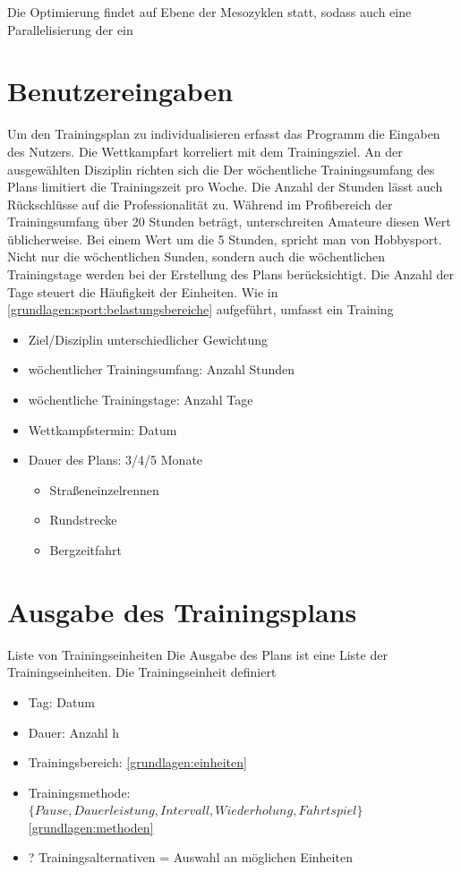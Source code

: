 Die Optimierung findet auf Ebene der Mesozyklen statt, sodass auch eine Parallelisierung der ein
\section{Benutzereingaben}
Um den Trainingsplan zu individualisieren erfasst das Programm die Eingaben des Nutzers. \newline
Die Wettkampfart korreliert mit dem Trainingsziel. An der ausgewählten Disziplin richten sich die \newline
Der wöchentliche Trainingsumfang des Plans limitiert die Trainingszeit pro Woche. Die Anzahl der Stunden lässt auch Rückschlüsse auf die Professionalität zu. Während im Profibereich der Trainingsumfang über 20 Stunden beträgt, unterschreiten Amateure diesen Wert üblicherweise. Bei einem Wert um die 5 Stunden, spricht man von Hobbysport. \newline
Nicht nur die wöchentlichen Sunden, sondern auch die wöchentlichen Trainingstage werden bei der Erstellung des Plans berücksichtigt. Die Anzahl der Tage steuert die Häufigkeit der Einheiten.
Wie in \ref{grundlagen:sport:belastungsbereiche} aufgeführt, umfasst ein Training 
\begin{itemize}
    \item Ziel/Disziplin \cite[S.11]{Radsporttraining} unterschiedlicher Gewichtung\cite[S.14]{Radsporttraining}
    \item wöchentlicher Trainingsumfang: Anzahl Stunden
    \item wöchentliche Trainingstage: Anzahl Tage
    \item Wettkampfstermin: Datum
    \item Dauer des Plans: 3/4/5 Monate
    \begin{itemize}
        \item Straßeneinzelrennen
        \item Rundstrecke
        \item Bergzeitfahrt
    \end{itemize}
\end{itemize}

\section{Ausgabe des Trainingsplans}
Liste von Trainingseinheiten
\label{sec:modellierung:output}
Die Ausgabe des Plans ist eine Liste der Trainingseinheiten. Die Trainingseinheit definiert 
    \begin{itemize}
        \item Tag: Datum
        \item Dauer: Anzahl h
        \item Trainingsbereich: \ref{grundlagen:einheiten}
        \item Trainingsmethode: $\{Pause, Dauerleistung, Intervall, Wiederholung, Fahrtspiel\}$ \ref{grundlagen:methoden}
        \item ? Trainingsalternativen = Auswahl an möglichen Einheiten
    \end{itemize}

